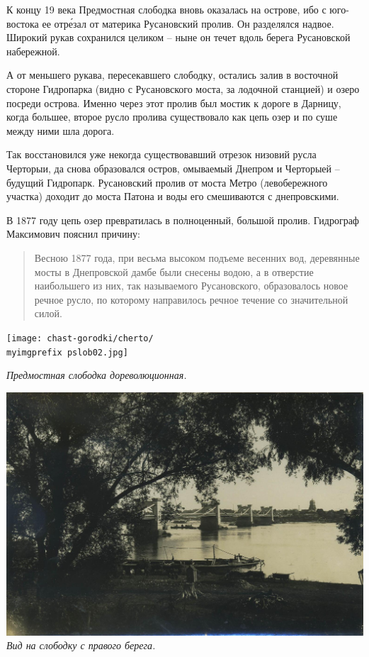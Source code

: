 К концу 19 века Предмостная слободка вновь оказалась на острове, ибо с юго-востока ее отр\'езал от материка Русановский пролив. Он разделялся надвое. Широкий рукав сохранился целиком – ныне он течет вдоль берега Русановской набережной.

А от меньшего рукава, пересекавшего слободку, остались залив в восточной стороне Гидропарка (видно с Русановского моста, за лодочной станцией) и озеро посреди острова. Именно через этот пролив был мостик к дороге в Дарницу, когда большее, второе русло пролива существовало как цепь озер и по суше между ними шла дорога.

Так восстановился уже некогда существовавший отрезок низовий русла Черторыи, да снова образовался остров, омываемый Днепром и Черторыей – будущий Гидропарк. Русановский пролив от моста Метро (левобережного участка) доходит до моста Патона и воды его смешиваются с днепровскими.

В 1877 году цепь озер превратилась в полноценный, большой пролив. Гидрограф Максимович пояснил причину:

\begin{quotation}
Весною 1877 года, при весьма высоком подъеме весенних вод, деревянные мосты в Днепровской дамбе были снесены водою, а в отверстие наибольшего из них, так называемого Русановского, образовалось новое речное русло, по которому направилось речное течение со значительной силой. 
\end{quotation}

\newpage
\vspace*{\fill}
\begin{center}
\texttt{[image: chast-gorodki/cherto/\\myimgprefix pslob02.jpg]}

\textit{Предмостная слободка дореволюционная.}
\end{center}


\begin{center}
\includegraphics[width=\linewidth]{chast-gorodki/cherto/predm-s-prevber.jpg}
\textit{Вид на слободку с правого берега.}
\end{center}

